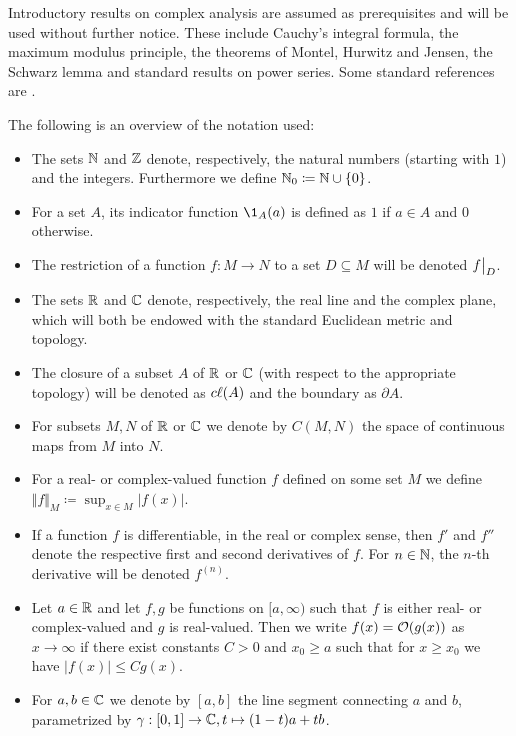 Introductory results on complex analysis are assumed as prerequisites and will be used without further notice. These include Cauchy's integral formula, the maximum modulus principle, the theorems of Montel, Hurwitz and Jensen, the Schwarz lemma and standard results on power series. Some standard references are \cite{bluemlinger-complex-analysis,remmert-function-theory,stein-shakarchi-princeton}.

The following is an overview of the notation used:

\begin{itemize}[label=$\rightsquigarrow$]
    \item The sets $\mathbb{N}$ and $\mathbb{Z}$ denote, respectively, the natural numbers (starting with $1$) and the integers. Furthermore we define $\mathbb{N}_0 \coloneqq \mathbb{N} \cup \{ 0 \}$.
    \item For a set $A$, its indicator function $\1_A(a)$ is defined as $1$ if $a \in A$ and $0$ otherwise.
    \item The restriction of a function $f : M \to N$ to a set $D \subseteq M$ will be denoted $\restr{f}{D}$.
    \item The sets $\mathbb{R}$ and $\mathbb{C}$ denote, respectively, the real line and the complex plane, which will both be endowed with the standard Euclidean metric and topology.
    \item The closure of a subset $A$ of $\mathbb{R}$ or $\mathbb{C}$ (with respect to the appropriate topology) will be denoted as $c\ell({A})$ and the boundary as $\partial A$.
    \item For subsets $M, N$ of $\mathbb{R}$ or $\mathbb{C}$ we denote by $C(M, N)$ the space of continuous maps from $M$ into $N$.
    \item For a real- or complex-valued function $f$ defined on some set $M$ we define $\Vert f \Vert_M \coloneqq \sup_{x \in M} \vert f(x) \vert$.
    \item If a function $f$ is differentiable, in the real or complex sense, then $f'$ and $f''$ denote the respective first and second derivatives of $f$. For $n \in \mathbb{N}$, the $n$-th derivative will be denoted $f^{(n)}$.
    \item Let $a \in \mathbb{R}$ and let $f, g$ be functions on $[a, \infty)$ such that $f$ is either real- or complex-valued and $g$ is real-valued. Then we write $f(x) = \mathcal{O}(g(x))$ as $x \to \infty$ if there exist constants $C > 0$ and $x_0 \geq a$ such that for $x \geq x_0$ we have $\vert f(x) \vert \leq C g(x)$.
    \item For $a, b \in \mathbb{C}$ we denote by $[a, b]$ the line segment connecting $a$ and $b$, parametrized by $\gamma : [0, 1] \to \mathbb{C}, t \mapsto (1 - t) a + tb$.

\end{itemize}
